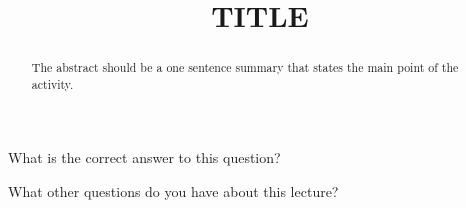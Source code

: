\documentclass{ximera}
\title{TITLE}
\begin{document}
\begin{abstract}
  The abstract should be a one sentence summary that states the main point of the activity.
\end{abstract}

\maketitle

\begin{question}
  What is the correct answer to this question?

  
    \begin{multipleChoice}
    \end{multipleChoice}  
  
\end{question}

\begin{question}
What other questions do you have about this lecture?
\begin{freeResponse}
\end{freeResponse}
\end{question}
\end{document}
